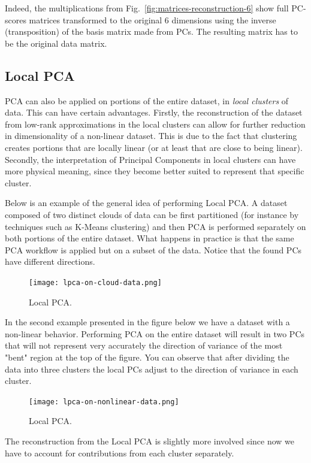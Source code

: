 \documentclass[10pt,twocolumn]{article}
\begin{document}
Indeed, the multiplications from Fig.~\ref{fig:matrices-reconstruction-6} show full PC-scores matrices transformed to the original 6 dimensions using the inverse (transposition) of the basis matrix made from PCs. The resulting matrix has to be the original data matrix.

\subsection{Local PCA}

PCA can also be applied on portions of the entire dataset, in \textit{local clusters} of data. This can have certain advantages. Firstly, the reconstruction of the dataset from low-rank approximations in the local clusters can allow for further reduction in dimensionality of a non-linear dataset. This is due to the fact that clustering creates portions that are locally linear (or at least that are close to being linear). Secondly, the interpretation of Principal Components in local clusters can have more physical meaning, since they become better suited to represent that specific cluster.

Below is an example of the general idea of performing Local PCA. A dataset composed of two distinct clouds of data can be first partitioned (for instance by techniques such as K-Means clustering) and then PCA is performed separately on both portions of the entire dataset. What happens in practice is that the same PCA workflow is applied but on a subset of the data. Notice that the found PCs have different directions.

\begin{figure}[H]
\centering\texttt{[image: lpca-on-cloud-data.png]}
\caption{Local PCA.}
\label{fig:local-pca-1}
\end{figure}

In the second example presented in the figure below we have a dataset with a non-linear behavior. Performing PCA on the entire dataset will result in two PCs that will not represent very accurately the direction of variance of the most "bent" region at the top of the figure. You can observe that after dividing the data into three clusters the local PCs adjust to the direction of variance in each cluster.

\begin{figure}[H]
\centering\texttt{[image: lpca-on-nonlinear-data.png]}
\caption{Local PCA.}
\label{fig:local-pca-2}
\end{figure}

The reconstruction from the Local PCA is slightly more involved since now we have to account for contributions from each cluster separately.
\end{document}
